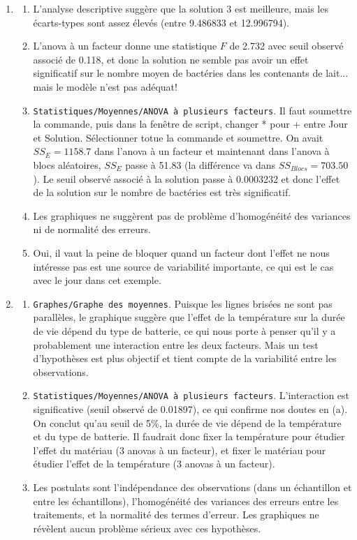 \documentclass[12pt]{article}
\begin{document}
{\begin{enumerate}
\item 
    \begin{enumerate}
    \item[(a)] L'analyse descriptive suggère que la solution 3 est meilleure, mais les écarts-types sont assez élevés (entre 9.486833 et 12.996794). 
    \item[(b)] L'anova à un facteur donne une statistique $F$ de 2.732 avec seuil observé associé de 0.118, et donc la solution ne semble pas avoir un effet significatif sur le nombre moyen de bactéries dans les contenants de lait... mais le modèle n'est pas adéquat!
    \item[(c)] {\tt Statistiques/Moyennes/ANOVA à plusieurs facteurs}. Il faut soumettre la commande, puis dans la fenêtre de script, changer * pour + entre Jour et Solution. Sélectionner totue la commande et soumettre. On avait $SS_E=1158.7$ dans l'anova à un facteur et maintenant dans l'anova à blocs aléatoires, $SS_E$ passe à 51.83 (la différence va dans $SS_{Blocs}=703.50$). Le seuil observé associé à la solution passe à 0.0003232 et donc l'effet de la solution sur le nombre de bactéries est très significatif.
    \item[(d)] Les graphiques ne suggèrent pas de problème d'homogénéité des variances ni de normalité des erreurs.
    \item[(e)] Oui, il vaut la peine de bloquer quand un facteur dont l'effet ne nous intéresse pas est une source de variabilité importante, ce qui est le cas avec le jour dans cet exemple.
    \end{enumerate}


\item 
    \begin{enumerate}
    \item[(a)] {\tt Graphes/Graphe des moyennes}. Puisque les lignes brisées ne sont pas parallèles, le graphique suggère que l'effet de la température sur la durée de vie dépend du type de batterie, ce qui nous porte à penser qu'il y a probablement une interaction entre les deux facteurs. Mais un test d'hypothèses est plus objectif et tient compte de la variabilité entre les observations. 
    \item[(b)] {\tt Statistiques/Moyennes/ANOVA à plusieurs facteurs}. L'interaction est significative (seuil observé de 0.01897), ce qui confirme nos doutes en (a). On conclut qu'au seuil de 5\%, la durée de vie dépend de la température et du type de batterie. Il faudrait donc fixer la température pour étudier l'effet du matériau (3 anovas à un facteur), et fixer le matériau pour étudier l'effet de la température (3 anovas à un facteur).
    \item[(c)] Les postulats sont l'indépendance des observations (dans un échantillon et entre les échantillons), l'homogénéité des variances des erreurs entre les traitements, et la normalité des termes d'erreur. Les graphiques ne révèlent aucun problème sérieux avec ces hypothèses.
    \end{enumerate}



\end{enumerate}}
\end{document}
